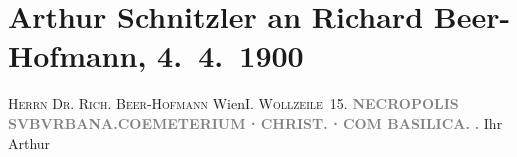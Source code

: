 

         
         \renewcommand{\erwaehntePersonen}{Personen: Richard Beer-Hofmann}
         \renewcommand{\erwaehnteOrte}{Orte: I., Innere Stadt, Solin, Wien, Wollzeile}
         \renewcommand{\erwaehnteWerke}{}
               \section[Arthur Schnitzler an Richard Beer-Hofmann, 4. 4. 1900]{ Arthur Schnitzler an Richard Beer-Hofmann, 4. 4. 1900}\nopagebreak{}\rehead{ }\begin{ledgroupsized}[t]{13cm}\normalsize\beginnumbering \toendnotes[C]{\smallbreak\pagebreak[2]} 
\toendnotes[C]{\smallbreak}\pstart{}{\pb}\textsc{Herrn Dr. Rich. Beer-Hofmann
                  }\pend{}\pstart{}Wien\pend{}\pstart{}\textsc{I. Wollzeile 15.}\pend{}{\bigskip}\pstart
           \noindent{}{\pb}\textcolor{gray}{\textbf{NECROPOLIS SVBVRBANA.}}\hfill \textcolor{gray}{\textbf{COEMETERIUM ⋅ CHRIST. ⋅ COM
                  BASILICA.}}\pend
           \pstart
           \centering{}\textcolor{gray}{\textbf{\label{K_L01030_1v}\label{K_L01030_1h}.}}\pend
           \pstart Ihr \spacefill\mbox{Arthur}\pend{}
         
         \endnumbering{}\end{ledgroupsized}  \newcommand{\dateiname}{L01030}\newcommand{\titel}{Arthur Schnitzler an Richard Beer-Hofmann, 4. 4. 1900}\newcommand{\editorInnen}{Martin Anton Müller und Gerd-Hermann Susen}
      